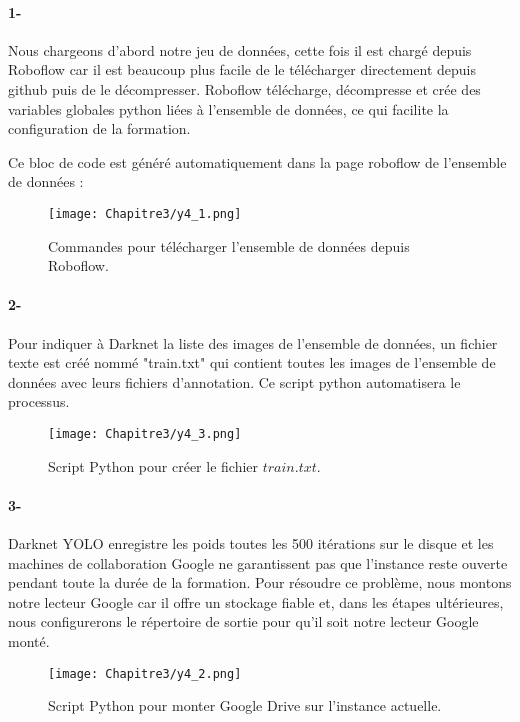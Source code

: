     \paragraph{1-} Nous chargeons d'abord notre jeu de données, cette fois il est chargé depuis Roboflow car il est beaucoup plus facile de le télécharger directement depuis github puis de le décompresser. Roboflow télécharge, décompresse et crée des variables globales python liées à l'ensemble de données, ce qui facilite la configuration de la formation.

     Ce bloc de code est généré automatiquement dans la page roboflow de l'ensemble de données :
     \begin{figure}[H]
               \centering
               \texttt{[image: Chapitre3/y4\_1.png]}
               \caption{Commandes pour télécharger l'ensemble de données depuis Roboflow.}
               \label{y4_1}
               \end{figure}
     
     \paragraph{2-} Pour indiquer à Darknet la liste des images de l'ensemble de données, un fichier texte est créé nommé "train.txt" qui contient toutes les images de l'ensemble de données avec leurs fichiers d'annotation. Ce script python automatisera le processus.
     \begin{figure}[H]
               \centering
               \texttt{[image: Chapitre3/y4\_3.png]}
               \caption{Script Python pour créer le fichier \(train.txt\).}
               \label{y4_2}
               \end{figure}

     \paragraph{3-} Darknet YOLO enregistre les poids toutes les 500 itérations sur le disque et les machines de collaboration Google ne garantissent pas que l'instance reste ouverte pendant toute la durée de la formation. Pour résoudre ce problème, nous montons notre lecteur Google car il offre un stockage fiable et, dans les étapes ultérieures, nous configurerons le répertoire de sortie pour qu'il soit notre lecteur Google monté.
     \begin{figure}[H]
               \centering
               \texttt{[image: Chapitre3/y4\_2.png]}
               \caption{Script Python pour monter Google Drive sur l'instance actuelle.}
               \label{y4_3}
               \end{figure}

